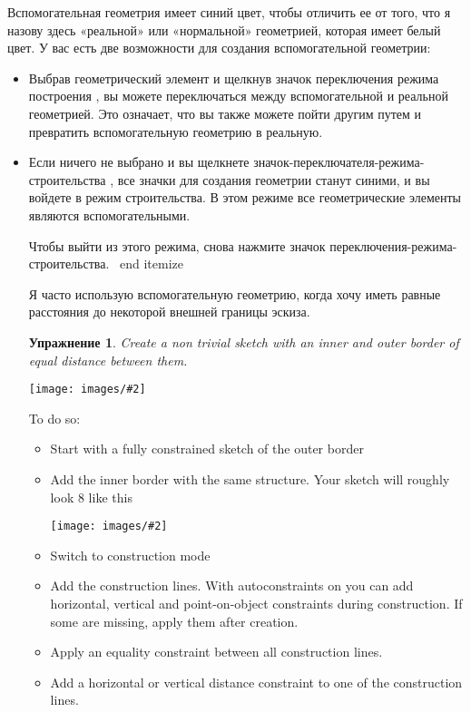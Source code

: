 \documentclass[12pt,titlepage]{article}
\newcommand{\icon}[1]{\raisebox{-1em}{\rule{0pt}{27pt}\texttt{[image: images/\#1]}}}
\newcommand{\img}[2]{\vspace{2ex}\noindent\texttt{[image: images/\#2]}}
\newtheorem{Exercise}{Упражнение}
\begin{document}
Вспомогательная геометрия имеет синий цвет, чтобы отличить ее от того, что я назову здесь «реальной» или «нормальной» геометрией, которая имеет белый цвет. У вас есть две возможности для создания вспомогательной геометрии:
\begin {itemize}
\item Выбрав геометрический элемент и щелкнув значок переключения режима построения \icon {Sketcher_AlterConstruction}, вы можете переключаться между вспомогательной и реальной геометрией. Это означает, что вы также можете пойти другим путем и превратить вспомогательную геометрию в реальную.
\item Если ничего не выбрано и вы щелкнете значок-переключателя-режима-строительства \icon {Sketcher_AlterConstruction}, все значки для создания геометрии станут синими, и вы войдете в режим строительства. В этом режиме все геометрические элементы являются вспомогательными.

       Чтобы выйти из этого режима, снова нажмите значок переключения-режима-строительства.
\ end {itemize}


Я часто использую вспомогательную геометрию, когда хочу иметь равные расстояния до некоторой внешней границы эскиза.

\begin{Exercise}
Create a non trivial sketch with an inner and outer border of equal distance between them.
\end{Exercise}
\hspace{\leftmargin}\img{width=0.78\textwidth}{ConstructionReady}

To do so:
\begin{itemize}
\item Start with a fully constrained sketch of the outer border
\item Add the inner border with the same structure. Your sketch will roughly look 8      like this

      \img{width=0.75\textwidth}{ConstructionPrep}
\item Switch to construction mode
\item Add the construction lines. With autoconstraints on you can add horizontal,       vertical and point-on-object constraints during construction. If some are       missing, apply them after creation.
\item Apply an equality constraint between all construction lines.
\item Add a horizontal or vertical distance constraint to one of the construction lines.
\end{itemize}


\end{itemize}
\end{document}
